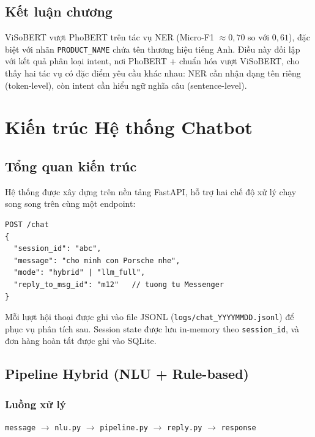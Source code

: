\documentclass[12pt, a4paper]{report}
\begin{document}
\section{Kết luận chương}

ViSoBERT vượt PhoBERT trên tác vụ NER (Micro-F1 $\approx 0,70$ so với $0,61$),
đặc biệt với nhãn \texttt{PRODUCT\_NAME} chứa tên thương hiệu tiếng Anh.
Điều này đối lập với kết quả phân loại intent, nơi PhoBERT + chuẩn hóa vượt
ViSoBERT, cho thấy hai tác vụ có đặc điểm yêu cầu khác nhau:
NER cần nhận dạng tên riêng (token-level), còn intent cần hiểu ngữ nghĩa câu
(sentence-level).

\chapter{Kiến trúc Hệ thống Chatbot}

\section{Tổng quan kiến trúc}

Hệ thống được xây dựng trên nền tảng FastAPI,
hỗ trợ hai chế độ xử lý chạy song song trên cùng một endpoint:

\begin{lstlisting}[caption={API endpoint chính}]
POST /chat
{
  "session_id": "abc",
  "message": "cho minh con Porsche nhe",
  "mode": "hybrid" | "llm_full",
  "reply_to_msg_id": "m12"   // tuong tu Messenger
}
\end{lstlisting}

Mỗi lượt hội thoại được ghi vào file JSONL
(\texttt{logs/chat\_YYYYMMDD.jsonl}) để phục vụ phân tích sau.
Session state được lưu in-memory theo \texttt{session\_id},
và đơn hàng hoàn tất được ghi vào SQLite.

\section{Pipeline Hybrid (NLU + Rule-based)}

\subsection{Luồng xử lý}

\begin{center}
\texttt{message} $\rightarrow$ \texttt{nlu.py} $\rightarrow$
\texttt{pipeline.py} $\rightarrow$ \texttt{reply.py} $\rightarrow$ \texttt{response}
\end{center}
\end{document}
